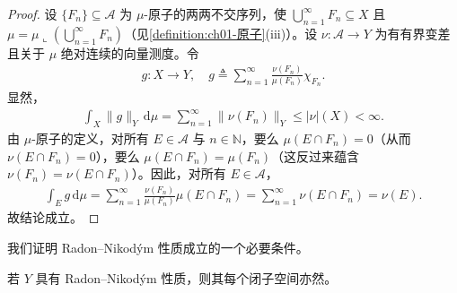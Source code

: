 \documentclass[../../main.tex]{subfiles}%
\begin{document}
\begin{proof}
设 $\{F_n\}\subseteq\mathcal{A}$ 为 $\mu$-原子的两两不交序列，使 $\bigcup_{n=1}^\infty F_n\subseteq X$ 且 $\mu=\mu\llcorner(\bigcup_{n=1}^\infty F_n)$（见\cref{definition:ch01-原子}(iii)）。设 $\nu:\mathcal{A}\to Y$ 为有有界变差且关于 $\mu$ 绝对连续的向量测度。令
\begin{align*}
g:X\to Y,\quad g\triangleq \sum_{n=1}^\infty\frac{\nu(F_n)}{\mu(F_n)}\chi_{F_n}.
\end{align*}
显然，
\begin{align*}
\int_X\|g\|_Y\,\mathrm{d}\mu=\sum_{n=1}^\infty\|\nu(F_n)\|_Y\leqslant|\nu|(X)<\infty.
\end{align*}
由 $\mu$-原子的定义，对所有 $E\in\mathcal{A}$ 与 $n\in\mathbb{N}$，要么 $\mu(E\cap F_n)=0$（从而 $\nu(E\cap F_n)=0$），要么 $\mu(E\cap F_n)=\mu(F_n)$（这反过来蕴含 $\nu(F_n)=\nu(E\cap F_n)$）。因此，对所有 $E\in\mathcal{A}$，
\begin{align*}
\int_E g\,\mathrm{d}\mu=\sum_{n=1}^\infty\frac{\nu(F_n)}{\mu(F_n)}\mu(E\cap F_n)=\sum_{n=1}^\infty\nu(E\cap F_n)=\nu(E).
\end{align*}
故结论成立。
\end{proof}

我们证明 Radon--Nikodým 性质成立的一个必要条件。

\begin{proposition}\label{proposition:ch04-RNP子空间}
若 $Y$ 具有 Radon--Nikodým 性质，则其每个闭子空间亦然。
\end{proposition}
\end{document}
